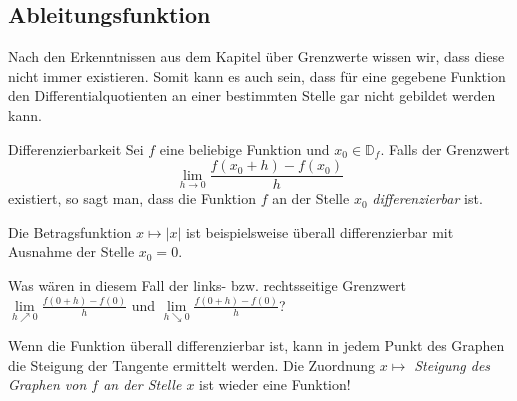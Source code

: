 \clearpage
\subsection{Ableitungsfunktion}




Nach den Erkenntnissen aus dem Kapitel über Grenzwerte wissen wir, dass diese nicht immer existieren. Somit kann es auch sein, dass für eine gegebene Funktion den Differentialquotienten an einer bestimmten Stelle gar nicht gebildet werden kann.
\begin{definition}
    {Differenzierbarkeit}{}
    Sei $f$ eine beliebige Funktion und $x_0 \in \mathbb{D}_f$. Falls der Grenzwert 
    $$ \lim_{h\rightarrow0}\frac{f(x_0+h)-f(x_0)}{h} $$
    existiert, so sagt man, dass die Funktion $f$ an der Stelle $x_0$ \emph{differenzierbar} ist.
\end{definition}

Die Betragsfunktion $x\mapsto |x|$ ist beispielsweise überall differenzierbar mit Ausnahme der Stelle $x_0=0$.

\begin{center}
\end{center}


Was wären in diesem Fall der links- bzw. rechtsseitige Grenzwert $\lim\limits_{h\nearrow 0} \frac{f(0+h)-f(0)}{h}$ und $\lim\limits_{h\searrow 0} \frac{f(0+h)-f(0)}{h}$?

Wenn die Funktion überall differenzierbar ist, kann in jedem Punkt des Graphen die Steigung der Tangente ermittelt werden. Die Zuordnung \emph{
$x\mapsto$ Steigung des Graphen von $f$ an der Stelle $x$} ist wieder eine Funktion!

